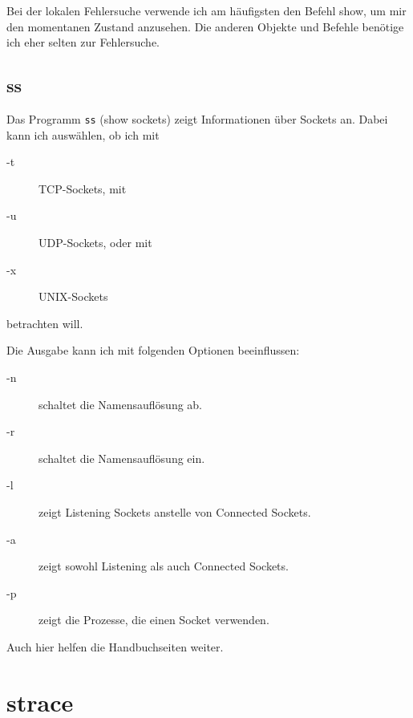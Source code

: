 \begin{normaltext}
  Bei der lokalen Fehlersuche verwende ich am häufigsten den Befehl show, um
  mir den momentanen Zustand anzusehen. Die anderen Objekte und Befehle
  benötige ich eher selten zur Fehlersuche.

  \subsection*{ss}

  Das Programm \verb?ss? (show sockets) zeigt Informationen über Sockets an.
  Dabei kann ich auswählen, ob ich mit
  \begin{description}
    \item[-t] TCP-Sockets, mit
    \item[-u] UDP-Sockets, oder mit
    \item[-x] UNIX-Sockets
  \end{description}
  betrachten will.

  Die Ausgabe kann ich mit folgenden Optionen beeinflussen:
  \begin{description}
    \item[-n] schaltet die Namensauflösung ab.
    \item[-r] schaltet die Namensauflösung ein.
    \item[-l] zeigt Listening Sockets anstelle von Connected Sockets.
    \item[-a] zeigt sowohl Listening als auch Connected Sockets.
    \item[-p] zeigt die Prozesse, die einen Socket verwenden.
  \end{description}

  Auch hier helfen die Handbuchseiten weiter.
\end{normaltext}

\section{strace}
\label{sec:lokal-werkzeuge-strace}

